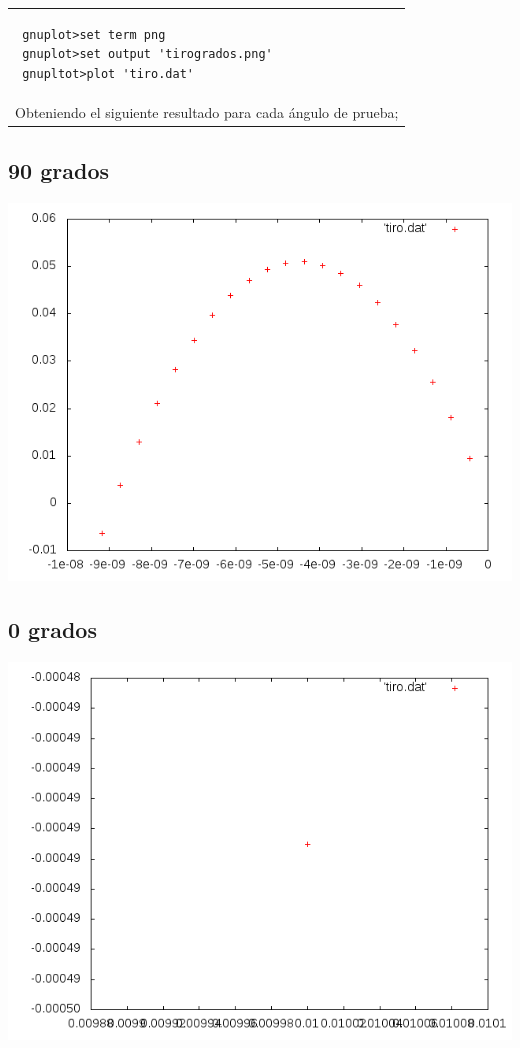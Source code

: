 \documentclass[10pt]{article}
\begin{document}
\begin{tabular}{l}
\begin{verbatim}  
 gnuplot>set term png
 gnuplot>set output 'tirogrados.png'
 gnupltot>plot 'tiro.dat'
\end{verbatim}\\
Obteniendo el siguiente resultado para cada ángulo de prueba;
\end{tabular}

\subsection{90 grados}
\begin{center}
   \includegraphics[scale=0.5]{tiro90.png}
\end{center}

\subsection{0 grados}
\begin{center}
   \includegraphics[scale=0.5]{tiro0.png}
\end{center}
\end{document}
